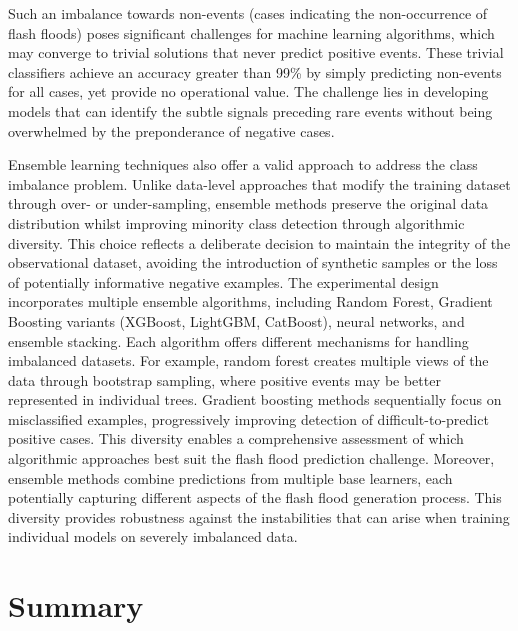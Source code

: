 Such  an imbalance towards non-events (cases indicating the non-occurrence of flash floods) poses significant challenges for machine learning algorithms, which may converge to trivial solutions that never predict positive events. These trivial classifiers achieve an accuracy greater than 99\% by simply predicting non-events for all cases, yet provide no operational value. The challenge lies in developing models that can identify the subtle signals preceding rare events without being overwhelmed by the preponderance of negative cases.

Ensemble  learning techniques also offer a valid approach to address the class imbalance problem. Unlike data-level approaches that modify the training dataset through over- or under-sampling, ensemble methods preserve the original data distribution whilst improving minority class detection through algorithmic diversity. This choice reflects a deliberate decision to maintain the integrity of the observational dataset, avoiding the introduction of synthetic samples or the loss of potentially informative negative examples. The experimental design incorporates multiple ensemble algorithms, including Random Forest, Gradient Boosting variants (XGBoost, LightGBM, CatBoost), neural networks, and ensemble stacking. Each algorithm offers different mechanisms for handling imbalanced datasets. For example, random forest creates multiple views of the data through bootstrap sampling, where positive events may be better represented in individual trees. Gradient boosting methods sequentially focus on misclassified examples, progressively improving detection of difficult-to-predict positive cases. This diversity enables a comprehensive assessment of which algorithmic approaches best suit the flash flood prediction challenge. Moreover, ensemble methods combine predictions from multiple base learners, each potentially capturing different aspects of the flash flood generation process. This diversity provides robustness against the instabilities that can arise when training individual models on severely imbalanced data.



\section{Summary}

